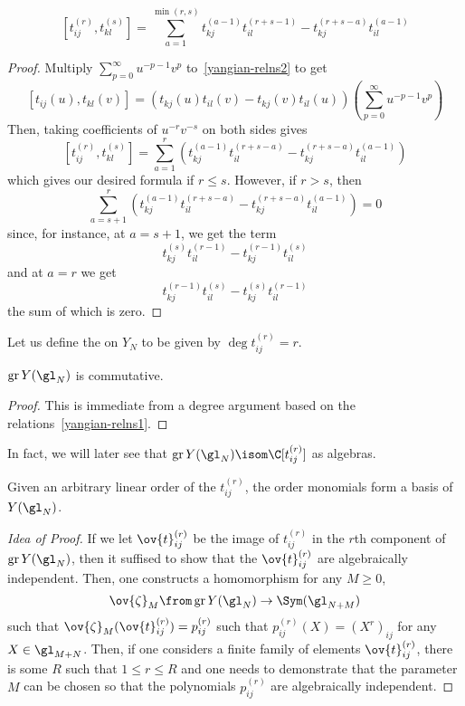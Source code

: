 \documentclass[11pt,leqno,oneside]{amsbook}
\numberwithin{thm}{section}
\newcommand{\associatedGraded}{\operatorname{gr}}
\begin{document}
\begin{prop}
  \[
     [t_{ij}^{(r)}, t_{kl}^{(s)}] = \sum_{a=1}^{\min(r,s)}
     t_{kj}^{(a-1)}t_{il}^{(r+s-1)} - t_{kj}^{(r+s-a)} t_{il}^{(a-1)}
  \]
\end{prop}
\begin{proof}
  Multiply \(\sum_{p=0}^\infty u^{-p-1}v^p\) to~\ref{yangian-relns2}
  to get \[
    [t_{ij}(u), t_{kl}(v)] = (t_{kj}(u)t_{il}(v) -
    t_{kj}(v)t_{il}(u))\left( \sum_{p=0}^\infty u^{-p-1}v^p \right)
  \]
  Then, taking coefficients of \(u^{-r}v^{-s}\) on both sides gives \[
    [t^{(r)}_{ij}, t^{(s)}_{kl}] = \sum_{a=1}^r
    (t_{kj}^{(a-1)}t_{il}^{(r+s-a)}-t_{kj}^{(r+s-a)}t_{il}^{(a-1)}) 
  \]
  which gives our desired formula if \(r \leq s\). However, if \(r >
  s\), then \[
    \sum_{a=s+1}^r (t_{kj}^{(a-1)}t_{il}^{(r+s-a)} -
    t_{kj}^{(r+s-a)}t_{il}^{(a-1)}) = 0
  \]
  since, for instance, at \(a=s+1\), we get the term \[
    t_{kj}^{(s)}t_{il}^{(r-1)} - t_{kj}^{(r-1)}t_{il}^{(s)}
  \]
  and at \(a=r\) we get \[
    t_{kj}^{(r-1)}t_{il}^{(s)}-t_{kj}^{(s)}t_{il}^{(r-1)}
  \]
  the sum of which is zero.
\end{proof}
\begin{defn}
  Let us define the  on \(Y_N\) to be given by
  \(\deg t_{ij}^{(r)} = r\). 
\end{defn}
\begin{lem}
  \(\associatedGraded Y(\gl_N)\) is commutative. 
\end{lem}
\begin{proof}
  This is immediate from a degree argument based on the relations~\ref{yangian-relns1}.
\end{proof}
  In fact, we will later see that \(\associatedGraded Y(\gl_N) \isom
  \C[t_{ij}^{(r)}]\) as algebras.
\begin{thm}
  Given an arbitrary linear order of the \(t_{ij}^{(r)}\), the order
  monomials form a basis of \(Y(\gl_N)\).
\end{thm}
\begin{proof}[Idea of Proof]
  If we let \(\ov{t}_{ij}^{(r)}\) be the image of \(t_{ij}^{(r)}\) in
  the \(r\)th component of \(\associatedGraded Y(\gl_N)\), then it
  suffised to show that the \(\ov{t}_{ij}^{(r)}\) are algebraically
  independent. Then, one constructs a homomorphism for any \(M \geq 0\), \[
    \ov{\zeta}_M \from \associatedGraded Y(\gl_N) \to \Sym(\gl_{N+M})
  \]
  such that \(\ov{\zeta}_M(\ov{t}_{ij}^{(r)}) = p_{ij}^{(r)}\) such
  that \(p_{ij}^{(r)}(X) = (X^r)_{ij}\) for any \(X \in
  \gl_{M+N}\). Then, if one considers a finite family of elements
  \(\ov{t}_{ij}^{(r)}\), there is some \(R\) such that \(1 \leq r \leq
  R\) and one needs to demonstrate that the parameter \(M\) can be
  chosen so that the polynomials \(p_{ij}^{(r)}\) are algebraically
  independent. 
\end{proof}
\end{document}
